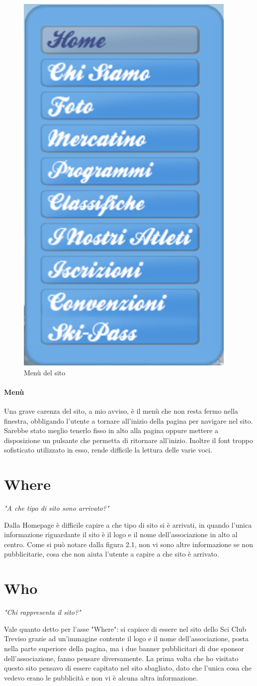 \begin{figure}
	\vspace{-20pt}
	\begin{center}
	  \includegraphics[width=0.2 \textwidth]{./immagini/menu}
	\end{center}
	\vspace{-20pt}
	\caption[Menù del sito]{Menù del sito}
	\vspace{-70pt}
\end{figure}
\paragraph{Menù}
Una grave carenza del sito, a mio avviso, è il menù che non resta fermo nella finestra, obbligando l'utente a tornare all'inizio della pagina per navigare nel sito. Sarebbe stato meglio tenerlo fisso in alto alla pagina oppure mettere a disposizione un pulsante che permetta di ritornare all'inizio. Inoltre il font troppo sofisticato utilizzato in esso, rende difficile la lettura delle varie voci.
\vspace{40pt}

    \section{Where}
        \begin{center}
            \textit{"A che tipo di sito sono arrivato?"}
        \end{center}
        Dalla Homepage è difficile capire a che tipo  di  sito si è arrivati, in quando l'unica informazione riguardante il sito è il logo e il nome dell'associazione in alto al centro. Come si può notare dalla figura 2.1, non vi sono altre informazione se non pubblicitarie, cosa che non aiuta l'utente a capire a che sito è arrivato.
         
    \section{Who}
        \begin{center}
            \textit{"Chi rappresenta il sito?"}
        \end{center}
        Vale quanto detto per l'asse "Where": si capisce di essere nel sito dello Sci Club Treviso grazie ad un'immagine contente il logo e il nome dell'associazione, posta nella parte superiore della pagina, ma i due banner pubblicitari di due sponsor dell'associazione, fanno pensare diversamente. La prima volta che ho visitato questo sito pensavo di essere capitato nel sito sbagliato, dato che l'unica cosa che vedevo erano le pubblicità e non vi è alcuna altra informazione. 

